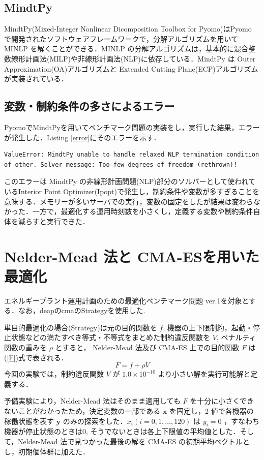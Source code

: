 \documentclass[twocolumn]{jarticle}
\begin{document}
    \subsection{MindtPy}
    MindtPy(Mixed-Integer Nonlinear Dicomposition Toolbox for Pyomo)\cite{BERNAL2018895}はPyomo で開発されたソフトウェアフレームワークで，分解アルゴリズムを用いて MINLP を解くことができる．MINLP の分解アルゴリズムは，基本的に混合整数線形計画法(MILP)や非線形計画法(NLP)に依存している．MindtPy は Outer Approximation(OA)アルゴリズム\cite{OA}と Extended Cutting Plane(ECP)アルゴリズムが実装されている．

    \subsection{変数・制約条件の多さによるエラー}
    PyomoでMindtPyを用いてベンチマーク問題の実装をし，実行した結果，エラーが発生した．Listing \ref{error}にそのエラーを示す．
    \begin{lstlisting}[caption = 発生したエラー, label = error]
        ValueError: MindtPy unable to handle relaxed NLP termination condition of other. Solver message: Too few degrees of freedom (rethrown)!
    \end{lstlisting}
   このエラーは MindtPy の非線形計画問題(NLP)部分のソルバーとして使われているInterior Point Optimizer(Ipopt)で発生し，制約条件や変数が多すぎることを意味する．メモリーが多いサーバでの実行，変数の固定をしたが結果は変わらなかった．一方で，最適化する運用時刻数を小さくし，定義する変数や制約条件自体を減らすと実行できた．
  
\section{Nelder-Mead 法と CMA-ESを用いた最適化}
エネルギープラント運用計画のための最適化ベンチマーク問題 ver.1\cite{denki}を対象とする．なお，deapのcmaのStrategyを使用した\cite{DEAP_JMLR2012}.

単目的最適化の場合(Strategy)は元の目的関数を $f$, 機器の上下限制約，起動・停止状態などの満たすべき等式・不等式をまとめた制約違反関数を $V$, ペナルティ関数の重みを $\rho$ とすると， Nelder-Mead 法及び CMA-ES 上での目的関数 $F$ は(\ref{F})式で表される．
\begin{equation}
    \label{F}
    F = f + \rho V
\end{equation}
今回の実験では，制約違反関数 $V$ が $1.0 \times 10^{-10}$ より小さい解を実行可能解と定義する．

予備実験により，Nelder-Mead 法はそのまま適用しても $F$ を十分に小さくできないことがわかったため，決定変数の一部である $\bm{x}$ を固定し，2 値で各機器の稼働状態を表す $\bm{y}$ のみの探索をした．$x_i(i=0,1,\dots,120)$ は $y_i=0$ ，すなわち機器が停止状態のときは0, そうでないときは各上下限値の平均値とした．そして，Nelder-Mead 法で見つかった最後の解を CMA-ES の初期平均ベクトルとし，初期個体群に加えた．
\end{document}
